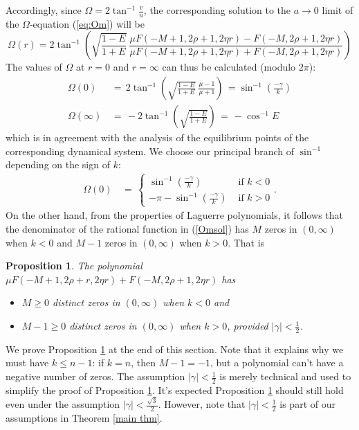 \documentclass[11 pt]{article}
\newtheorem{prop}[thm]{Proposition}%
\newcommand\Om{\Omega}
\renewcommand\({\left(}
\renewcommand\){\right)}
\renewcommand\Om{\Omega}
\newcommand\<{\langle}
\renewcommand\>{\rangle}
\newcommand\g{\gamma}
\newcommand\8{\infty}
\newcommand\beq{\begin{equation}}
\newcommand\eeq{\end{equation}}
\newcommand{\ga} {\gamma}\newcommand{\Ga}{\Gamma}
\newcommand{\half}{\frac{1}{2}}
\begin{document}
Accordingly, since $\Om = 2 \tan^{-1}\frac{v}{u}$, the corresponding solution to the $a \to 0$ limit of the $\Om$-equation (\ref{eq:Om}) will be
\beq\label{Omsol}
\Om(r) = 2 \tan^{-1}\left( \sqrt{\frac{1-E}{1+E}}\ \frac{\mu F(-M+1,2\rho+1,2\eta r) - F(-M,2\rho+1,2\eta r)}{\mu F(-M+1,2\rho+1,2\eta r) + F(-M,2\rho+1,2\eta r)}\right)
\eeq
The values of $\Om$ at $r=0$ and $r=\infty$ can thus be calculated (modulo $2\pi$):
\begin{align}
\Om(0) \,&=\, 2 \tan^{-1}\left( \sqrt{\frac{1-E}{1+E}}\ \frac{\mu-1}{\mu+1}\right) \,=  \sin^{-1}\left(\frac{-\ga}{k}\right)
\\
 \Om(\infty) \,&=\, -2\tan^{-1}\left( \sqrt{\frac{1-E}{1+E}}\right) \,=\, -\cos^{-1}E
\end{align}
 which is in agreement with the analysis of the equilibrium points of the corresponding dynamical system.  We choose our principal branch of $\sin^{-1}$ depending on the sign of $k$:
\begin{align}
\Om(0) \,&=\, \left\{\begin{array}{ll} 
\sin^{-1}(\frac{-\ga}{k}) & \mbox{ if }k<0
\\
-\pi - \sin^{-1}(\frac{-\ga}{k}) & \mbox{ if }k>0
\end{array}\right. .
\end{align}
On the other hand, from the properties of Laguerre polynomials, it follows that the denominator of the rational function in (\ref{Omsol}) has $M$ zeros in $(0, \infty)$ when $k < 0$ and $M-1$ zeros in $(0, \infty)$ when $k>0$. That is

\medskip

\begin{prop}\label{zeros of Om denom prop}
The polynomial 
$\mu F(-M + 1, 2\rho + r, 2\eta r) + F(-M, 2\rho + 1, 2\eta r)$ has
\begin{itemize}
\item[$\bullet$] $M \geq 0$ distinct zeros in $(0, \infty)$ when $k < 0$ and
\item[$\bullet$] $M - 1 \geq 0$ distinct zeros in $(0, \infty)$ when $k > 0$,  provided $|\g| < \half$.  
\end{itemize}
\end{prop}

\medskip

We prove Proposition \ref{zeros of Om denom prop} at the end of this section. Note that it explains why we must have $k \leq n - 1$: if $k = n$, then $M - 1 = -1$, but a polynomial can't have a negative number of zeros. The assumption $|\g| < \half$ is merely technical and used to simplify the proof of Proposition \ref{zeros of Om denom prop}. It's expected Proposition \ref{zeros of Om denom prop} should still hold even under the assumption $|\g| < \frac{\sqrt{3}}{2}$. However, note that $|\gamma| < \half$ is part of our assumptions in Theorem \ref{main thm}.
\end{document}
